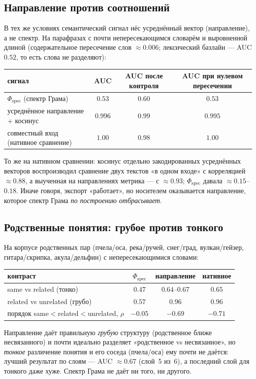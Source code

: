 \documentclass[11pt,a4paper]{article}
\theoremstyle{definition}
\theoremstyle{plain}
\begin{document}
\subsection{Направление против соотношений}

В тех же условиях семантический сигнал нёс усреднённый вектор (направление), а не
спектр. На парафразах с почти непересекающимся словарём и выровненной длиной
(содержательное пересечение слов $\approx0.006$; лексический базлайн — AUC $0.52$, то
есть слова не разделяют):
\begin{center}
\begin{tabular}{@{}lccc@{}}
\toprule
сигнал & AUC & AUC после контроля & AUC при нулевом пересечении\\
\midrule
$\Phi_{\mathrm{spec}}$ (спектр Грама) & $0.53$ & $0.60$ & $0.53$\\
усреднённое направление + косинус & $0.996$ & $0.99$ & $0.995$\\
совместный вход (нативное сравнение) & $1.00$ & $0.98$ & $1.00$\\
\bottomrule
\end{tabular}
\end{center}
То же на нативном сравнении: косинус отдельно закодированных усреднённых векторов
воспроизводил сравнение двух текстов «в одном входе» с корреляцией $\approx0.88$, а
выученная на направлениях метрика — с $\approx0.93$; $\Phi_{\mathrm{spec}}$ давала
$\approx0.15$--$0.18$. Иначе говоря, экспорт «работает», но носителем оказывается
направление, которое спектр Грама \emph{по построению отбрасывает}.

\subsection{Родственные понятия: грубое против тонкого}

На корпусе родственных пар (пчела/оса, река/ручей, снег/град, вулкан/гейзер,
гитара/скрипка, акула/дельфин) с непересекающимися словами:
\begin{center}
\begin{tabular}{@{}lccc@{}}
\toprule
контраст & $\Phi_{\mathrm{spec}}$ & направление & нативное\\
\midrule
same vs related (тонко) & $0.47$ & $0.64$--$0.67$ & $0.65$\\
related vs unrelated (грубо) & $0.57$ & $0.96$ & $0.96$\\
порядок same$<$related$<$unrelated, $\rho$ & $-0.05$ & $-0.69$ & $-0.71$\\
\bottomrule
\end{tabular}
\end{center}
Направление даёт правильную \emph{грубую} структуру (родственное ближе несвязанного) и
почти идеально разделяет «родственное vs несвязанное», но \emph{тонкое} различение
понятия и его соседа (пчела/оса) ему почти не даётся: лучший результат по слоям — AUC
$\approx0.67$ (слой~5 из~6), а последний слой для тонкого даже хуже. Спектр Грама не
даёт ни того, ни другого.
\end{document}
